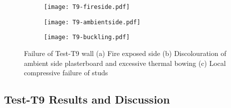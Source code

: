\begin{figure}[!htbp]
	\centering
	\begin{subfigure}[b]{0.4\textwidth}
		\centering
		\texttt{[image: T9-fireside.pdf]}
		\caption{}
		\label{subfig:T9-fireside}
	\end{subfigure}
	\begin{subfigure}[b]{0.4\textwidth}
		\centering
		\texttt{[image: T9-ambientside.pdf]}
		\caption{}
		\label{subfig:T9-ambientside}
	\end{subfigure}
	\begin{subfigure}[b]{0.4\textwidth}
		\centering
		\texttt{[image: T9-buckling.pdf]}
		\caption{}
		\label{subfig:T9-buckling}
	\end{subfigure}
	   \caption{Failure of Test-T9 wall (a) Fire exposed side (b) Discolouration of ambient side plasterboard and excessive thermal bowing (c) Local compressive failure of studs}
	   \label{fig:T9-failure}
\end{figure}

\subsection{Test-T9 Results and Discussion}

